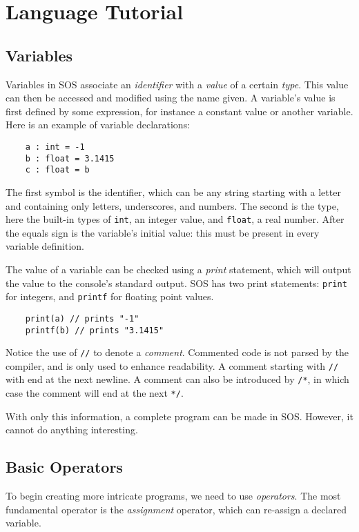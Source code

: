 \documentclass[main.tex]{subfiles}
\begin{document}
	\section{Language Tutorial}
	
	\subsection{Variables}
	
	Variables in SOS associate an \textit{identifier} with a \textit{value} of a certain \textit{type}. This value can then be accessed and modified using the name given. A variable's value is first defined by some expression, for instance a constant value or another variable. Here is an example of variable declarations:
	
	\begin{lstlisting}
	a : int = -1
	b : float = 3.1415
	c : float = b \end{lstlisting}
	
	The first symbol is the identifier, which can be any string starting with a letter and containing only letters, underscores, and numbers. The second is the type, here the built-in types of \texttt{int}, an integer value, and \texttt{float}, a real number. After the equals sign is the variable's initial value: this must be present in every variable definition. \newline
	
	The value of a variable can be checked using a \textit{print} statement, which will output the value to the console's standard output. SOS has two print statements: \texttt{print} for integers, and \texttt{printf} for floating point values.
	
	\begin{lstlisting}
	print(a) // prints "-1"
	printf(b) // prints "3.1415" \end{lstlisting}
	
	Notice the use of \texttt{//} to denote a \textit{comment}. Commented code is not parsed by the compiler, and is only used to enhance readability. A comment starting with \texttt{//} with end at the next newline. A comment can also be introduced by \texttt{/*}, in which case the comment will end at the next \texttt{*/}. \newline
	
	With only this information, a complete program can be made in SOS. However, it cannot do anything interesting.
	
	\subsection{Basic Operators}
	To begin creating more intricate programs, we need to use \textit{operators}. The most fundamental operator is the \textit{assignment} operator, which can re-assign a declared variable.
	
\end{document}
